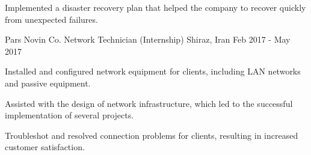 \begin{cventries}
{\begin{cvitems}
        \item {Implemented a disaster recovery plan that helped the company to recover quickly from unexpected failures.}
      \end{cvitems}%
    }%
  \cventry
    {Pars Novin Co.} %
    {Network Technician (Internship)} %
    {Shiraz, Iran} %
    {Feb 2017 - May 2017} %
    {
      \begin{cvitems} %
        \item {Installed and configured network equipment for clients, including LAN networks and passive equipment.}
        \item {Assisted with the design of network infrastructure, which led to the successful implementation of several projects.}
        \item {Troubleshot and resolved connection problems for clients, resulting in increased customer satisfaction.}%
      \end{cvitems}
    }
\end{cventries}
